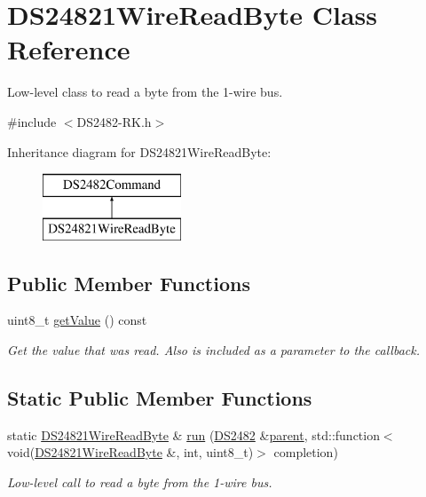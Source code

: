 \hypertarget{class_d_s24821_wire_read_byte}{}\section{D\+S24821\+Wire\+Read\+Byte Class Reference}
\label{class_d_s24821_wire_read_byte}


Low-\/level class to read a byte from the 1-\/wire bus.  




{\ttfamily \#include $<$D\+S2482-\/\+R\+K.\+h$>$}

Inheritance diagram for D\+S24821\+Wire\+Read\+Byte\+:\begin{figure}[H]
\begin{center}
\leavevmode
\includegraphics[height=2.000000cm]{class_d_s24821_wire_read_byte}
\end{center}
\end{figure}
\subsection*{Public Member Functions}
\begin{DoxyCompactItemize}
\item 
\mbox{\label{class_d_s24821_wire_read_byte_a958288a6d8d3e7c970e668099dce3b82}} 
uint8\+\_\+t \mbox{\hyperlink{class_d_s24821_wire_read_byte_a958288a6d8d3e7c970e668099dce3b82}{get\+Value}} () const
\begin{DoxyCompactList}\small\item\em Get the value that was read. Also is included as a parameter to the callback. \end{DoxyCompactList}\end{DoxyCompactItemize}
\subsection*{Static Public Member Functions}
\begin{DoxyCompactItemize}
\item 
\mbox{\label{class_d_s24821_wire_read_byte_aa7e399c9eca3042d9d3002cd53516d42}} 
static \mbox{\hyperlink{class_d_s24821_wire_read_byte}{D\+S24821\+Wire\+Read\+Byte}} \& \mbox{\hyperlink{class_d_s24821_wire_read_byte_aa7e399c9eca3042d9d3002cd53516d42}{run}} (\mbox{\hyperlink{class_d_s2482}{D\+S2482}} \&\mbox{\hyperlink{class_d_s2482_command_a54a41fb8a610ef2077f5e5377771aaf3}{parent}}, std\+::function$<$ void(\mbox{\hyperlink{class_d_s24821_wire_read_byte}{D\+S24821\+Wire\+Read\+Byte}} \&, int, uint8\+\_\+t)$>$ completion)
\begin{DoxyCompactList}\small\item\em Low-\/level call to read a byte from the 1-\/wire bus. \end{DoxyCompactList}\end{DoxyCompactItemize}
